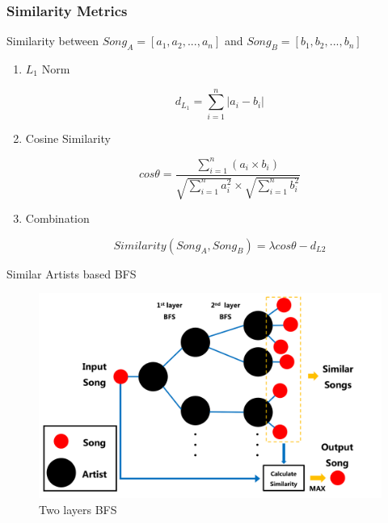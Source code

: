 \documentclass{beamer}
\begin{document}
\begin{frame}
\frametitle{Similarity Metrics}
Similarity between $Song_A = [a_1, a_2, ..., a_n]$ and $Song_B = [b_1, b_2, ..., b_n]$

\begin{enumerate}
    \item {$L_1$ Norm} 
    
    $$
    d_{L_1} = \sum_{i=1}^{n} |a_i - b_i|
    $$
    
    \item Cosine Similarity 
    
    $$
    cos\theta = \frac{\sum_{i=1}^{n} (a_i \times b_i)}{\sqrt{\sum_{i=1}^n a_i^2} \times \sqrt{\sum_{i=1}^n b_i^2}}
    $$


    \item Combination
    
    $$
    Similarity(Song_A, Song_B) =  \lambda cos\theta - d_{L2}
    $$

    
\end{enumerate}
    
\end{frame}

\begin{frame}{Similar Artists based BFS}
\begin{figure}
    \centering
    \includegraphics[width=0.9\linewidth]{img/bfs.png}
    \caption{Two layers BFS}
    \label{fig:bfs}
\end{figure}

\end{frame}
\end{document}
